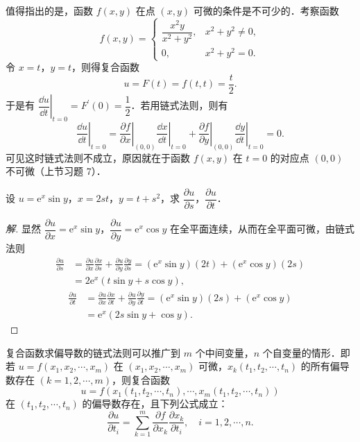 值得指出的是，函数 $f(x,y)$ 在点 $(x,y)$ 可微的条件是不可少的．考察函数
\[
f(x,y)=\begin{cases}
\dfrac{x^{2}y}{x^{2}+y^{2}}, & x^{2}+y^{2}\neq 0,\\
0, & x^{2}+y^{2}=0.
\end{cases}
\]
令 $x=t$，$y=t$，则得复合函数
\[
u=F(t)=f(t,t)=\frac{t}{2}.
\]
于是有 $\left.\dfrac{\dd u}{\dd t}\right|_{t=0}=F^{\prime}(0)=\dfrac{1}{2}$．若用链式法则，则有
\[
\left.\frac{\dd u}{\dd t}\right|_{t=0}=\left.\frac{\partial f}{\partial x}\right|_{(0,0)}\left.\frac{\dd x}{\dd t}\right|_{t=0}+\left.\frac{\partial f}{\partial y}\right|_{(0,0)}\left.\frac{\dd y}{\dd t}\right|_{t=0}=0.
\]
可见这时链式法则不成立，原因就在于函数 $f(x,y)$ 在 $t=0$ 的对应点 $(0,0)$ 不可微（上节习题 7）．

\begin{example}\label{ex:16-2-1}
设 $u=\mathrm{e}^{x}\sin y$，$x=2st$，$y=t+s^{2}$，求 $\dfrac{\partial u}{\partial s}$，$\dfrac{\partial u}{\partial t}$．
\end{example}

\begin{proof}[解]
显然 $\dfrac{\partial u}{\partial x}=\mathrm{e}^{x}\sin y$，$\dfrac{\partial u}{\partial y}=\mathrm{e}^{x}\cos y$ 在全平面连续，从而在全平面可微，由链式法则
\[
\begin{aligned}
\frac{\partial u}{\partial s}&=\frac{\partial u}{\partial x}\frac{\partial x}{\partial s}+\frac{\partial u}{\partial y}\frac{\partial y}{\partial s}=(\mathrm{e}^{x}\sin y)(2t)+(\mathrm{e}^{x}\cos y)(2s)\\
&=2\mathrm{e}^{x}(t\sin y+s\cos y),
\end{aligned}
\]
\[
\begin{aligned}
\frac{\partial u}{\partial t}&=\frac{\partial u}{\partial x}\frac{\partial x}{\partial t}+\frac{\partial u}{\partial y}\frac{\partial y}{\partial t}=(\mathrm{e}^{x}\sin y)(2s)+(\mathrm{e}^{x}\cos y)\\
&=\mathrm{e}^{x}(2s\sin y+\cos y).
\end{aligned}
\]
\end{proof}

复合函数求偏导数的链式法则可以推广到 $m$ 个中间变量，$n$ 个自变量的情形．即若 $u=f(x_{1},x_{2},\cdots,x_{m})$ 在 $(x_{1},x_{2},\cdots,x_{m})$ 可微，$x_{k}(t_{1},t_{2},\cdots,t_{n})$ 的所有偏导数存在 $(k=1,2,\cdots,m)$，则复合函数
\[
u=f(x_{1}(t_{1},t_{2},\cdots,t_{n}),\cdots,x_{m}(t_{1},t_{2},\cdots,t_{n}))
\]
在 $(t_{1},t_{2},\cdots,t_{n})$ 的偏导数存在，且下列公式成立：
\[
\frac{\partial u}{\partial t_{i}}=\sum_{k=1}^{m}\frac{\partial f}{\partial x_{k}}\frac{\partial x_{k}}{\partial t_{i}},\quad i=1,2,\cdots,n.
\]

